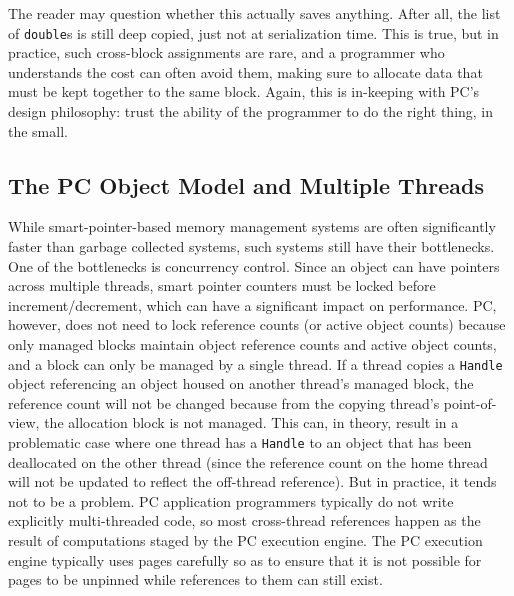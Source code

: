 The reader may question whether this actually saves anything.  After
all, the list of \texttt{double}s is still deep copied, just not at serialization time.
This is true, but in practice, such cross-block assignments are rare, and a programmer who understands the cost can often avoid them, making sure to allocate
data that must be kept together to the same block.
Again, this is in-keeping with PC's design philosophy: trust the ability of the programmer to do the right thing, in the small.

\subsection{The PC Object Model and Multiple Threads}

While smart-pointer-based memory management
systems are often significantly faster than garbage collected systems, such systems still have their bottlenecks.  One of the bottlenecks is concurrency
control.
Since an object can have pointers across multiple threads, smart pointer counters must be locked before increment/decrement, which
can have a significant impact on performance.  PC, however, does not need to lock reference counts (or active object counts) because only managed blocks maintain
object reference counts and active object counts,
and a block can only be managed by a single thread.  
If a thread copies a \texttt{Handle} object referencing an object housed on another thread's managed block, 
the reference count will not be changed because from the copying thread's point-of-view, the allocation block is not managed.
This can, in theory, result in a problematic case where one thread has a \texttt{Handle} to an object that has been deallocated on the other thread (since
the reference count on the home thread will not be updated to reflect the off-thread reference).  But in practice, it tends not to be a problem.  PC application
programmers typically do not write explicitly multi-threaded code, so most cross-thread references happen as the result of computations staged by the 
PC execution engine.  The PC execution engine typically uses pages carefully so as to ensure that 
it is not possible for pages to be unpinned while references to them can still exist.

